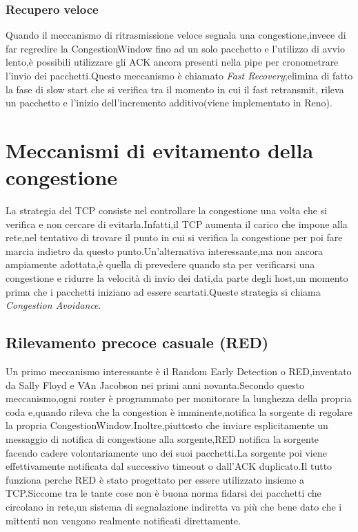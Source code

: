 \subsubsection{Recupero veloce}
Quando il meccanismo di ritrasmissione veloce segnala una congestione,invece di far regredire la CongestionWindow fino ad un solo pacchetto e l'utilizzo di avvio lento,è possibili utilizzare gli ACK ancora presenti nella pipe per cronometrare l'invio dei pacchetti.Questo meccanismo è chiamato \textit{Fast Recovery};elimina di fatto la fase di slow start che si verifica tra il momento in cui il fast retransmit, rileva un pacchetto e l'inizio dell'incremento additivo(viene implementato in Reno).
\section{Meccanismi di evitamento della congestione}
La strategia del TCP consiste nel controllare la congestione una volta che si verifica e non cercare di evitarla.Infatti,il TCP aumenta il carico che impone alla rete,nel tentativo di trovare il punto in cui si verifica la congestione per poi fare marcia indietro da questo punto.Un'alternativa interessante,ma non ancora ampiamente adottata,è quella di prevedere quando sta per verificarsi una congestione e ridurre la velocità di invio dei dati,da parte degli host,un momento prima che i pacchetti iniziano ad essere scartati.Queste strategia si chiama \textit{Congestion Avoidance}.
\subsection{Rilevamento precoce casuale (RED)}
Un primo meccanismo interessante è il Random Early Detection o RED,inventato da Sally Floyd e VAn Jacobson nei primi anni novanta.Secondo questo meccanismo,ogni router è programmato per monitorare la lunghezza della propria coda e,quando rileva che la congestion è imminente,notifica la sorgente di regolare la propria CongestionWindow.Inoltre,piuttosto che inviare esplicitamente un messaggio di notifica di congestione alla sorgente,RED notifica la sorgente facendo cadere volontariamente uno dei suoi pacchetti.La sorgente poi viene effettivamente notificata dal successivo timeout o dall'ACK duplicato.Il tutto funziona perche RED è stato progettato per essere utilizzato insieme a TCP.Siccome tra le tante cose non è buona norma fidarsi dei pacchetti che circolano in rete,un sistema di segnalazione indiretta va più che bene dato che i mittenti non vengono realmente notificati direttamente.\\
